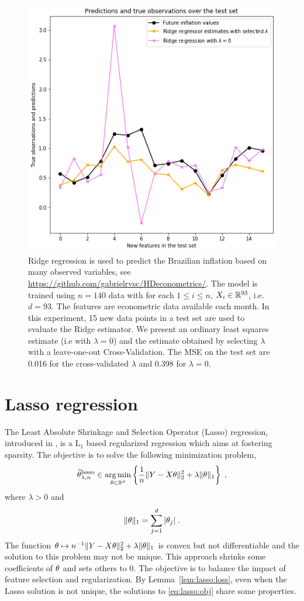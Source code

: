 \begin{figure}
\begin{center}
\includegraphics[width = .7\linewidth]{./Illustrations/ridge_pred_inflation.png}
\end{center}
\caption{Ridge regression is used to predict the Brazilian inflation based on many observed variables, see \url{https://github.com/gabrielrvsc/HDeconometrics/}. The model is trained using $n=140$ data with for each $1\leqslant i \leqslant n$, $X_i\in\mathbb{R}^{93}$, i.e. $d  =93$. The features are econometric data available each month. In this experiment, 15 new data points in a test set are used to evaluate the Ridge estimator. We present an ordinary least squares estimate (i.e with $\lambda = 0$) and the estimate obtained by selecting $\lambda$ with a leave-one-out Cross-Validation. The MSE on the test set are 0.016 for the cross-validated $\lambda$ and 0.398 for $\lambda = 0$.}
\end{figure}





\section{Lasso regression}
The Least Absolute Shrinkage and Selection Operator (Lasso) regression, introduced in \cite{tibshirani1996regression}, is a $\mathrm{L}_1$ based regularized regression which aims at fostering sparsity. The objective is to solve the following minimization problem,
\begin{equation}
\label{eq:lasso:obj}
\widehat \param^{\mathrm{lasso}}_{\lambda,n}\in  \argmin_{\param\in\rset^d}  \left\{\frac{1}{n}\|Y - X\param\|_2^2 + \lambda\|\param\|_1\right\}\eqsp,
\end{equation}
where $\lambda>0$ and
\[
\|\theta\|_1 = \sum_{j=1}^d|\theta_j|\;.
\]
The function $\theta \mapsto n^{-1}\|Y - X\theta\|_2^2 + \lambda\|\theta\|_1$ is convex but not differentiable and the solution to this problem may  not be unique. This approach shrinks some coefficients of $\theta$ and sets others to 0. The objective is to balance the impact of feature selection and regularization.  By Lemma~\ref{lem:lasso:loss}, even when the Lasso solution is not unique, the solutions to \eqref{eq:lasso:obj} share some properties. 

